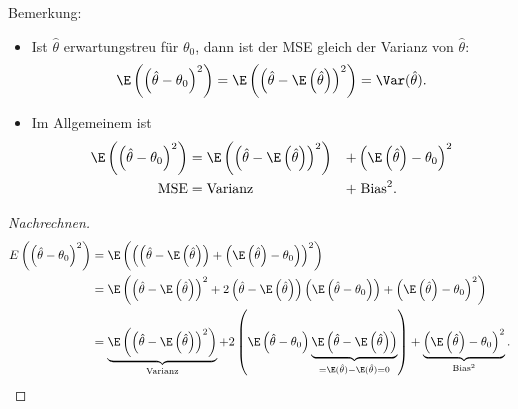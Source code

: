 \documentclass{tstextbook}
\begin{document}
\begin{remark}
	Bemerkung:
	\begin{itemize}
		\item Ist $ \hat{\theta} $ erwartungstreu für $ \theta_0 $, dann ist der MSE gleich der Varianz von $ \hat{\theta} $: 
		\[
			\E\left(\left(\hat{\theta}-\theta_0\right)^2\right) = \E\left(\left(\hat{\theta}-\E\left(\hat{\theta}\right)\right)^2\right) = \Var(\hat{\theta}).
		\]
		
		\item Im Allgemeinem ist
		\[
		\begin{aligned}
		\E\left(\left(\hat{\theta}-\theta_0\right)^2\right) & = \E\left(\left(\hat{\theta}-\E\left(\hat{\theta}\right)\right)^2\right) & + & \left(\E\left(\hat{\theta}\right)-\theta_0\right)^2 \\
		\text{MSE} & = \text{Varianz} & + & \; \text{Bias}^2.
		\end{aligned}
		\]
	\end{itemize}
\end{remark}

\begin{proof}[Nachrechnen]
	\[
	\begin{aligned}
		E\left(\left(\hat{\theta}-\theta_0\right)^2\right) & = \E\left(\left(\left(\hat{\theta}-\E\left(\hat{\theta}\right)\right)+ \left(\E\left(\hat{\theta}\right)-\theta_0\right)\right)^2\right) \\
		& = \E\left(\left(\hat{\theta}-\E\left(\hat{\theta}\right)\right)^2+2\left(\hat{\theta}-\E\left(\hat{\theta}\right)\right)\left(\E\left(\hat{\theta}-\theta_0\right)\right)+\left(\E\left(\hat{\theta}\right)-\theta_0\right)^2\right) \\
		& = \underbrace{\E\left(\left(\hat{\theta}-\E\left(\hat{\theta}\right)\right)^2\right)}_{\text{Varianz}}+2\left(\E\left(\hat{\theta}-\theta_0\right)\underbrace{\E\left(\hat{\theta}-\E\left(\hat{\theta}\right)\right)}_{=\E(\hat{\theta})-\E(\hat{\theta})=0}\right)+\underbrace{\left(\E\left(\hat{\theta}\right)-\theta_0\right)^2}_{\text{Bias}^2} .
	\end{aligned}
	\]

\end{proof}
\end{document}
